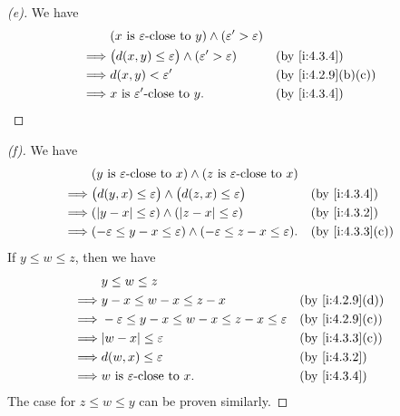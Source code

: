 \begin{proof}[(e)]
  We have
  \begin{align*}
             & (x \text{ is \(\varepsilon\)-close to } y) \land (\varepsilon' > \varepsilon)                        \\
    \implies & \big(d(x, y) \leq \varepsilon\big) \land (\varepsilon' > \varepsilon)         &  & \by{i:4.3.4}      \\
    \implies & d(x, y) < \varepsilon'                                                        &  & \by{i:4.2.9}[b,c] \\
    \implies & x \text{ is \(\varepsilon'\)-close to } y.                                    &  & \by{i:4.3.4}
  \end{align*}
\end{proof}

\begin{proof}[(f)]
  We have
  \begin{align*}
             & (y \text{ is } \varepsilon\text{-close to } x) \land (z \text{ is } \varepsilon\text{-close to } x)                      \\
    \implies & \big(d(y, x) \leq \varepsilon\big) \land \big(d(z, x) \leq \varepsilon\big)                         &  & \by{i:4.3.4}    \\
    \implies & (\abs{y - x} \leq \varepsilon) \land (\abs{z - x} \leq \varepsilon)                                 &  & \by{i:4.3.2}    \\
    \implies & (-\varepsilon \leq y - x \leq \varepsilon) \land (-\varepsilon \leq z - x \leq \varepsilon).        &  & \by{i:4.3.3}[c]
  \end{align*}
  If \(y \leq w \leq z\), then we have
  \begin{align*}
             & y \leq w \leq z                                                                     \\
    \implies & y - x \leq w - x \leq z - x                                    &  & \by{i:4.2.9}[d] \\
    \implies & -\varepsilon \leq y - x \leq w - x \leq z - x \leq \varepsilon &  & \by{i:4.2.9}[c] \\
    \implies & \abs{w - x} \leq \varepsilon                                   &  & \by{i:4.3.3}[c] \\
    \implies & d(w, x) \leq \varepsilon                                       &  & \by{i:4.3.2}    \\
    \implies & w \text{ is } \varepsilon\text{-close to } x.                  &  & \by{i:4.3.4}
  \end{align*}
  The case for \(z \leq w \leq y\) can be proven similarly.
\end{proof}

